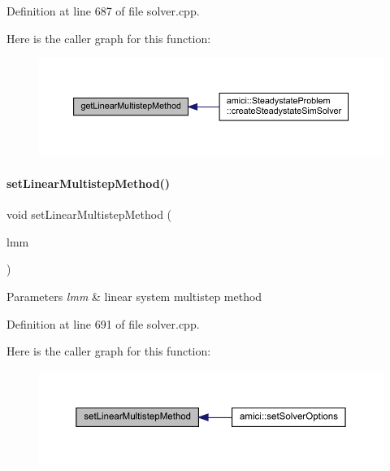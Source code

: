 Definition at line 687 of file solver.\+cpp.

Here is the caller graph for this function\+:
\nopagebreak
\begin{figure}[H]
\begin{center}
\leavevmode
\includegraphics[width=350pt]{classamici_1_1_solver_a60631d9a18e29c1102cae7cb77b9918c_icgraph}
\end{center}
\end{figure}
\mbox{\label{classamici_1_1_solver_a2143a6f85b81c24611aad5689865953c}} 
\paragraph{\texorpdfstring{set\+Linear\+Multistep\+Method()}{setLinearMultistepMethod()}}
{\footnotesize\ttfamily void set\+Linear\+Multistep\+Method (\begin{DoxyParamCaption}\item[{\mbox{\hyperlink{namespaceamici_a9ebe272482a8e073efe7078b7e96e8bc}{Linear\+Multistep\+Method}}}]{lmm }\end{DoxyParamCaption})}


\begin{DoxyParams}{Parameters}
{\em lmm} & linear system multistep method \\
\hline
\end{DoxyParams}


Definition at line 691 of file solver.\+cpp.

Here is the caller graph for this function\+:
\nopagebreak
\begin{figure}[H]
\begin{center}
\leavevmode
\includegraphics[width=350pt]{classamici_1_1_solver_a2143a6f85b81c24611aad5689865953c_icgraph}
\end{center}
\end{figure}
\mbox{\label{classamici_1_1_solver_a33883905a8ab056896373d76f18ce683}} 
